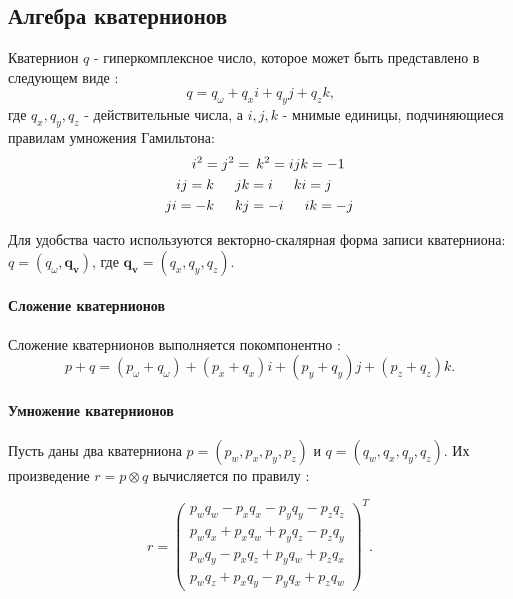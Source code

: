 \subsection{Алгебра кватернионов}

Кватернион $q$ - гиперкомплексное число, которое может быть представлено в следующем виде \cite{hypercomplex_number, salamin1974quaternions}:
\begin{equation*}
	q = q_{\omega} + q_x i + q_y j + q_z k \text{,}
\end{equation*}
где $q_x, q_y, q_z$ - действительные числа, а $i, j, k$ - мнимые единицы, подчиняющиеся правилам умножения Гамильтона:
\begin{align*}
	i^2 = j^2 =& \hspace*{5pt} k^2 = ijk = -1 \\
	ij = k  \hspace*{15pt} jk &= i  \hspace*{15pt} ki = j 	\\
	ji = -k \hspace*{15pt} kj &= -i \hspace*{15pt} ik = -j
\end{align*}

Для удобства часто используются векторно-скалярная форма записи кватерниона: $q = (q_{\omega}, \bm{q_v})$, где $\bm{q_v} = (q_x, q_y, q_z)$.


\paragraph{Сложение кватернионов}
Сложение кватернионов выполняется покомпонентно \cite{hypercomplex_number}:
\begin{equation*}
	p + q = (p_{\omega} + q_{\omega}) + (p_x + q_x) i + (p_y + q_y) j + (p_z + q_z) k \text{.}
\end{equation*}


\paragraph{Умножение кватернионов}
Пусть даны два кватерниона $p = (p_w, p_x, p_y, p_z)$ и $q = (q_w, q_x, q_y, q_z)$. Их произведение $r = p \otimes q$ вычисляется по правилу \cite{hypercomplex_number}:

\begin{equation}
	\label{eq:q_mult}
	r = \begin{pmatrix}
		p_w q_w - p_x q_x - p_y q_y - p_z q_z \\
		p_w q_x + p_x q_w + p_y q_z - p_z q_y \\
		p_w q_y - p_x q_z + p_y q_w + p_z q_x \\
		p_w q_z + p_x q_y - p_y q_x + p_z q_w
	\end{pmatrix}^T \text{.}
\end{equation}

